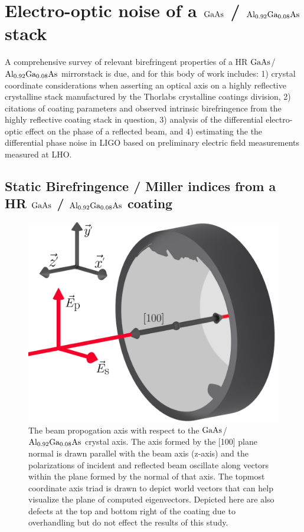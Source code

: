 
\section{Electro-optic noise of a \texorpdfstring{$\mathrm{GaAs}$}{gaas} / \texorpdfstring{$\mathrm{Al_{0.92}Ga_{0.08}As}$}{algaas} stack}
A comprehensive survey of relevant birefringent properties of a HR $\mathrm{GaAs}$/$\mathrm{Al_{0.92}Ga_{0.08}As}$ mirrorstack is due, and for this body of work includes: 1) crystal coordinate considerations when asserting an optical axis on a highly reflective crystalline stack manufactured by the Thorlabs crystalline coatings division, 2) citations of coating parameters and observed intrinsic birefringence from the highly reflective coating stack in question, 3) analysis of the differential electro-optic effect on the phase of a reflected beam, and 4) estimating the the differential phase noise in LIGO based on preliminary electric field measurements measured at LHO.

\subsection{Static Birefringence / Miller indices from a HR \texorpdfstring{$\mathrm{GaAs}$}{gaas} / \texorpdfstring{$\mathrm{Al_{0.92}Ga_{0.08}As}$}{algaas} coating}

\begin{figure}[!ht]
    \centering
	\includegraphics[width=.6\textwidth]{figs/ALGAAS/laser_mirror_algaas_coat_defect_coords.pdf}
	\caption{The beam propogation axis with respect to the $\mathrm{GaAs}$/$\mathrm{Al_{0.92}Ga_{0.08}As}$ crystal axis. The axis formed by the [100] plane normal is drawn parallel with the beam axis (z-axis) and the polarizations of incident and reflected beam oscillate along vectors within the plane formed by the normal of that axis. The topmost coordinate axis triad is drawn to depict world vectors that can help visualize the plane of computed eigenvectors. Depicted here are also defects at the top and bottom right of the coating due to overhandling but do not effect the results of this study.}
\label{fig:algaas_coord_defect}
\end{figure}

